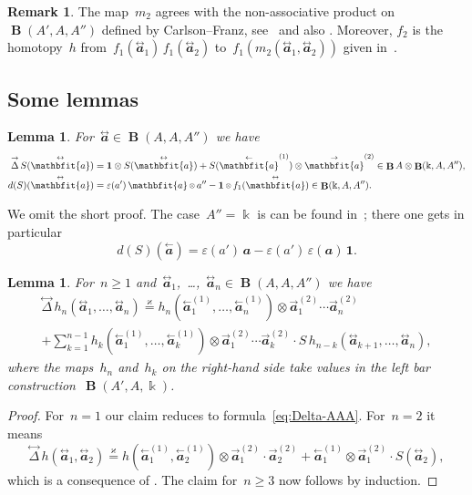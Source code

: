 \documentclass[letterpaper]{amsart}
\numberwithin{equation}{section}
\theoremstyle{plain}
\newtheorem{lemma}[theorem]{Lemma}
\theoremstyle{definition}
\newtheorem{remark}[theorem]{Remark}
\theoremstyle{remark}
\let\epsilon\varepsilon
\def\smallotimes{\mathbin{\mkern-1mu\vcenter{\hbox{$\scriptstyle\otimes$}}\mkern-1mu}}
\DeclareMathOperator{\BB}{\mathbf{B}}
\def\kk{\Bbbk}
\def\BBone{\mathbf{1}}
\def\aa{\mathbfit{a}}
\def\laa{\overset{\text{$\leftarrow$}}{\aa}}
\def\raa{\overset{\text{$\rightarrow$}}{\aa}}
\def\taa{\overset{\text{$\leftrightarrow$}}{\aa}}
\def\rDelta{\overset{\text{$\rightarrow$}}{\Delta}}
\def\tDelta{\overset{\text{$\leftrightarrow$}}{\Delta}}
\def\swee#1#2{#1^{(#2)}}
\let\KS\varkappa
\def\eqKS{\stackrel{\KS}{=}}
\def\ff{f_{1}}
\begin{document}
\begin{remark}
  The map~$m_{2}$ agrees with the non-associative product on~$\BB(A',A,A'')$ defined by Carlson--Franz,
  see~\cite[Thm.~A.5]{CarlsonFranz} and also . Moreover, $f_{2}$ is the homotopy~$h$
  from~$f_{1}(\taa_{1})\,f_{1}(\taa_{2})$ to~$f_{1}(m_{2}(\taa_{1},\taa_{2}))$
  given in~\cite[eq.~(A.19)]{CarlsonFranz}.
\end{remark}


\subsection{Some lemmas}

\begin{lemma}
  \label{thm:S}
  For~$\taa\in \BB(A,A,A'')$ we have
  \begin{align*}
    \rDelta\,S(\taa) &= \BBone \otimes S(\taa) + S(\swee{\laa}{1}) \otimes \swee{\raa}{2} \in \BB A\otimes \BB(\kk,A,A''), \\
    d(S)(\taa) &= \epsilon(a')\,\aa\smallotimes a'' - \BBone\smallotimes \ff(\taa) \in \BB(\kk,A,A'').
  \end{align*}
\end{lemma}

We omit the short proof.
The case~$A''=\kk$ is can be found in~\cite[\S 2.3]{GugenheimMunkholm:1974}; there one gets in particular
\begin{equation}
  \label{eq:d-S-k}
  d(S)(\laa) = \epsilon(a')\,\aa - \epsilon(a')\,\epsilon(\aa)\,\BBone.
\end{equation}

\begin{lemma}
  \label{thm:Delta-h}
  For~$n\ge1$ and~$\taa_{1}$,~\dots,~$\taa_{n}\in \BB(A,A,A'')$ we have
  \begin{multline*}
    \tDelta\,h_{n}(\taa_{1},\dots,\taa_{n}) \eqKS
      h_{n}(\swee{\laa_{1}}{1},\dots,\swee{\laa_{n}}{1}) \otimes \swee{\raa_{1}}{2}\cdots\swee{\raa_{n}}{2} \\
      + \sum_{k=1}^{n-1} h_{k}(\swee{\laa_{1}}{1},\dots,\swee{\laa_{k}}{1})
      \otimes \swee{\raa_{1}}{2}\cdots\swee{\raa_{k}}{2}\cdot S\,h_{n-k}(\taa_{k+1},\dots,\taa_{n}),
  \end{multline*}
  where the maps~$h_{n}$ and~$h_{k}$ on the right-hand side take values in the left bar construction~$\BB(A',A,\kk)$.  
\end{lemma}

\begin{proof}
  For~$n=1$ our claim reduces to formula~\eqref{eq:Delta-AAA}. For~$n=2$ it means
  \begin{equation}
    \tDelta\,h(\taa_{1},\taa_{2}) \eqKS
      h(\swee{\laa_{1}}{1},\swee{\laa_{2}}{1}) \otimes \swee{\raa_{1}}{2} \cdot \swee{\raa_{2}}{2}
      + \swee{\laa_{1}}{1} \otimes \swee{\raa_{1}}{2}\cdot S(\taa_{2}),
    \end{equation}
    which is a consequence of .
    The claim for~$n\ge3$ now follows by induction.
\end{proof}
\end{document}
